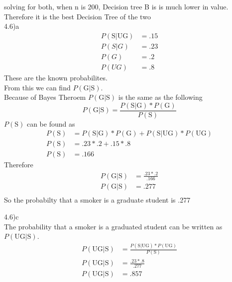 \documentclass[12pt,english]{article}
\begin{document}
solving for both, when n is 200, Decision tree B is is much lower in value. Therefore it is the best Decision Tree of the two\\
4.6)a\\
\begin{equation}\tag{1}\label{eq:1}
\begin{split}
P(\mbox{S}\vert \mbox{UG}) &= .15 \\
P(S\vert G) &= .23\\
P(G) &= .2\\
P(UG) &= .8
\end{split}
\end{equation}
These are the known probabilites.\\
 From this we can find $P(\mbox{G}\vert \mbox{S})$.\\
Because of Bayes Theroem  $P(\mbox{G}\vert \mbox{S})$ is the same as the following
\begin{equation}
P(\mbox{G}\vert \mbox{S}) = \frac{P(\mbox{S} \vert \mbox{G}) * P(\mbox{G})}{P(\mbox{S})}
\end{equation}
$P(\mbox{S})$ can be found as
\begin{equation}
\begin{split}
P(\mbox{S}) &=  P(\mbox{S} \vert \mbox{G}) * P(\mbox{G}) + P(\mbox{S} \vert \mbox{UG}) * P(\mbox{UG})\\
P(\mbox{S}) &= .23 *.2 + .15 * .8\\
P(\mbox{S}) &=.166
\end{split}
\end{equation}
Therefore
\begin{equation}
\begin{split}
P(\mbox{G}\vert \mbox{S}) &= \frac{.23 * .2}{.166}\\
P(\mbox{G}\vert \mbox{S}) &= .277\\
\end{split}
\end{equation}
 So the probabilty that a smoker is a graduate student is .277\par
 4.6)c\\
The probability that a smoker is a graduated student  can be written as $P(\mbox{UG}\vert \mbox{S})$.\\
\begin{equation}
\begin{split}
P(\mbox{UG}\vert \mbox{S}) &=  \frac{P(\mbox{S} \vert \mbox{UG}) * P(\mbox{UG})}{P(\mbox{S})}\\
P(\mbox{UG}\vert \mbox{S}) &=\frac{.23 * .8}{.277}\\
P(\mbox{UG}\vert \mbox{S}) &=.857\\
\end{split}
\end{equation}
\end{document}
